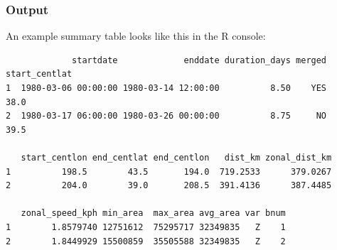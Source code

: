 \documentclass{article}
\begin{document}
%
%
%

\subsubsection{Output}
An example summary table looks like this in the R console:
\begin{verbatim}
             startdate             enddate duration_days merged start_centlat
1  1980-03-06 00:00:00 1980-03-14 12:00:00          8.50    YES          38.0
2  1980-03-17 06:00:00 1980-03-26 00:00:00          8.75     NO          39.5

   start_centlon end_centlat end_centlon   dist_km zonal_dist_km
1          198.5        43.5       194.0  719.2533      379.0267
2          204.0        39.0       208.5  391.4136      387.4485

   zonal_speed_kph min_area  max_area avg_area var bnum
1        1.8579740 12751612  75295717 32349835   Z    1
2        1.8449929 15500859  35505588 32349835   Z    2
\end{verbatim}
\end{document}
